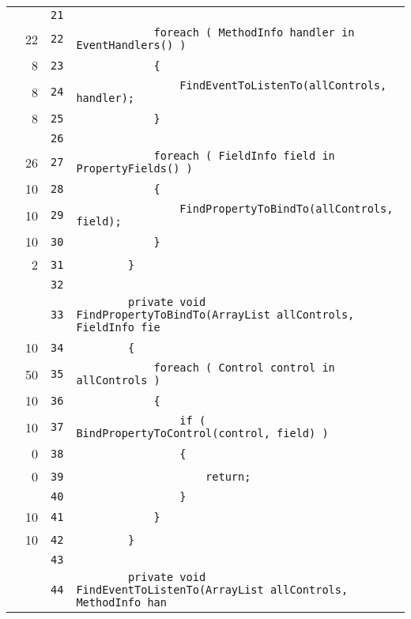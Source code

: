 \documentclass[a4paper,10pt]{article}
\begin{document}
\begin{longtable}[l]{lrrl}
\cellcolor{gray} &  & \verb~21~ & \verb~~\\
\cellcolor{green} & 22 & \verb~22~ & \verb~            foreach ( MethodInfo handler in EventHandlers() )~\\
\cellcolor{green} & 8 & \verb~23~ & \verb~            {~\\
\cellcolor{green} & 8 & \verb~24~ & \verb~                FindEventToListenTo(allControls, handler);~\\
\cellcolor{green} & 8 & \verb~25~ & \verb~            }~\\
\cellcolor{gray} &  & \verb~26~ & \verb~~\\
\cellcolor{green} & 26 & \verb~27~ & \verb~            foreach ( FieldInfo field in PropertyFields() )~\\
\cellcolor{green} & 10 & \verb~28~ & \verb~            {~\\
\cellcolor{green} & 10 & \verb~29~ & \verb~                FindPropertyToBindTo(allControls, field);~\\
\cellcolor{green} & 10 & \verb~30~ & \verb~            }~\\
\cellcolor{green} & 2 & \verb~31~ & \verb~        }~\\
\cellcolor{gray} &  & \verb~32~ & \verb~~\\
\cellcolor{gray} &  & \verb~33~ & \verb~        private void FindPropertyToBindTo(ArrayList allControls, FieldInfo fie~\\
\cellcolor{green} & 10 & \verb~34~ & \verb~        {~\\
\cellcolor{green} & 50 & \verb~35~ & \verb~            foreach ( Control control in allControls )~\\
\cellcolor{green} & 10 & \verb~36~ & \verb~            {~\\
\cellcolor{green} & 10 & \verb~37~ & \verb~                if ( BindPropertyToControl(control, field) )~\\
\cellcolor{red} & 0 & \verb~38~ & \verb~                {~\\
\cellcolor{red} & 0 & \verb~39~ & \verb~                    return;~\\
\cellcolor{gray} &  & \verb~40~ & \verb~                }~\\
\cellcolor{green} & 10 & \verb~41~ & \verb~            }~\\
\cellcolor{green} & 10 & \verb~42~ & \verb~        }~\\
\cellcolor{gray} &  & \verb~43~ & \verb~~\\
\cellcolor{gray} &  & \verb~44~ & \verb~        private void FindEventToListenTo(ArrayList allControls, MethodInfo han~\\

\end{longtable}
\end{document}
